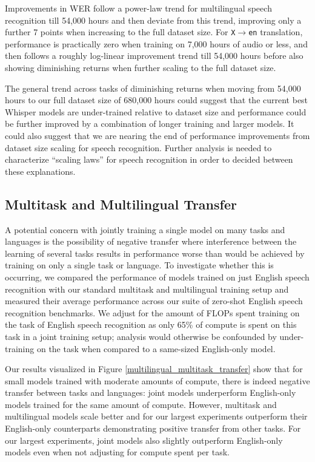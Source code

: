 \documentclass[nohyperref]{article}
\theoremstyle{plain}
\theoremstyle{definition}
\theoremstyle{remark}
\begin{document}
Improvements in WER follow a power-law trend for multilingual speech recognition till 54,000 hours and then deviate from this trend, improving only a further 7 points when increasing to the full dataset size. For \texttt{X$\rightarrow$en} translation, performance is practically zero when training on 7,000 hours of audio or less, and then follows a roughly log-linear improvement trend till 54,000 hours before also showing diminishing returns when further scaling to the full dataset size.

The general trend across tasks of diminishing returns when moving from 54,000 hours to our full dataset size of 680,000 hours could suggest that the current best Whisper models are under-trained relative to dataset size and performance could be further improved by a combination of longer training and larger models. It could also suggest that we are nearing the end of performance improvements from dataset size scaling for speech recognition. Further analysis is needed to characterize ``scaling laws'' for speech recognition in order to decided between these explanations.


\subsection{Multitask and Multilingual Transfer}

A potential concern with jointly training a single model on many tasks and languages is the possibility of negative transfer where interference between the learning of several tasks results in performance worse than would be achieved by training on only a single task or language. To investigate whether this is occurring, we compared the performance of models trained on just English speech recognition with our standard multitask and multilingual training setup and measured their average performance across our suite of zero-shot English speech recognition benchmarks. We adjust for the amount of FLOPs spent training on the task of English speech recognition as only 65\% of compute is spent on this task in a joint training setup; analysis would otherwise be confounded by under-training on the task when compared to a same-sized English-only model.

Our results visualized in Figure \ref{multilingual_multitask_transfer} show that for small models trained with moderate amounts of compute, there is indeed negative transfer between tasks and languages: joint models underperform English-only models trained for the same amount of compute. However, multitask and multilingual models scale better and for our largest experiments outperform their English-only counterparts demonstrating positive transfer from other tasks. For our largest experiments, joint models also slightly outperform English-only models even when not adjusting for compute spent per task.
\end{document}
